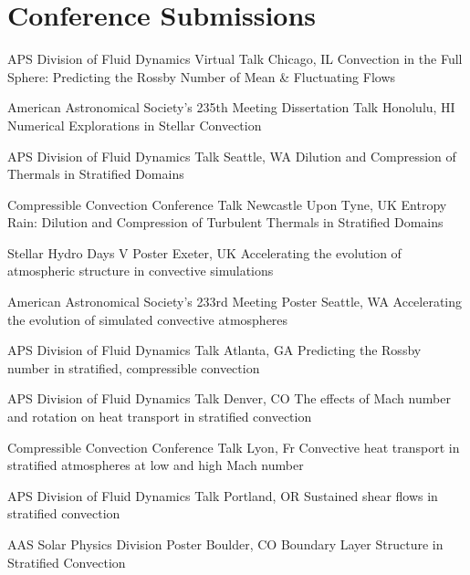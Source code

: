 \section{Conference Submissions}

		{APS Division of Fluid Dynamics}
		{Virtual Talk}
		{Chicago, IL}
		{}
		{Convection in the Full Sphere: Predicting the Rossby Number of Mean \& Fluctuating Flows}


\cventry{}
		{American Astronomical Society's 235th Meeting}
		{Dissertation Talk}
		{Honolulu, HI}
		{}
		{Numerical Explorations in Stellar Convection}

		{APS Division of Fluid Dynamics}
		{Talk}
		{Seattle, WA}
		{}
		{Dilution and Compression of Thermals in Stratified Domains}

\cventry{}
		{Compressible Convection Conference}
		{Talk}
		{Newcastle Upon Tyne, UK}
		{}
		{Entropy Rain: Dilution and Compression of Turbulent Thermals in Stratified Domains}

\cventry{}
		{Stellar Hydro Days V}
		{Poster}
		{Exeter, UK}
		{}
		{Accelerating the evolution of atmospheric structure in convective simulations}

\cventry{}
		{American Astronomical Society's 233rd Meeting}
		{Poster}
		{Seattle, WA}
		{}
		{Accelerating the evolution of simulated convective atmospheres}

		{APS Division of Fluid Dynamics}
		{Talk}
		{Atlanta, GA}
		{}
		{Predicting the Rossby number in stratified, compressible convection}

		{APS Division of Fluid Dynamics}
		{Talk}
		{Denver, CO}
		{}
		{The effects of Mach number and rotation on heat transport in stratified convection}

\cventry{}
		{Compressible Convection Conference}
		{Talk}
		{Lyon, Fr}
		{}
		{Convective heat transport in stratified atmospheres at low and high Mach number}

		{APS Division of Fluid Dynamics}
		{Talk}
		{Portland, OR}
		{}
		{Sustained shear flows in stratified convection}

\cventry{}
		{AAS Solar Physics Division}
		{Poster}
		{Boulder, CO}
		{}
		{Boundary Layer Structure in Stratified Convection}

